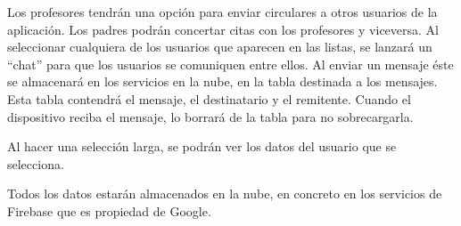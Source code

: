 		Los profesores tendrán una opción para enviar circulares a otros usuarios de la aplicación. Los padres podrán concertar citas con los profesores y viceversa.
		Al seleccionar cualquiera de los usuarios que aparecen en las listas, se lanzará un ``chat'' para que los usuarios se comuniquen entre ellos. Al enviar un mensaje éste se almacenará en los servicios en la nube, en la tabla destinada a los mensajes. Esta tabla contendrá el mensaje, el destinatario y el remitente. Cuando el dispositivo reciba el mensaje, lo borrará de la tabla para no sobrecargarla.
		
		\bigskip
		Al hacer una selección larga, se podrán ver los datos del usuario que se selecciona.
	
		Todos los datos estarán almacenados en la nube, en concreto en los servicios de Firebase\cite{6:firebase:online} que es propiedad de Google\cite{18:google:online}.

